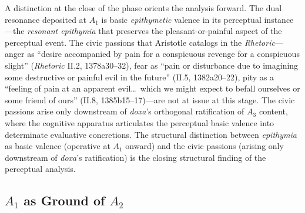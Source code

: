 \documentclass{article}
\begin{document}
A distinction at the close of the phase orients the analysis forward. The dual resonance deposited at $A_1$ is basic \textit{epithymetic} valence in its perceptual instance---the \textit{resonant epithymia} that preserves the pleasant-or-painful aspect of the perceptual event. The civic passions that Aristotle catalogs in the \textit{Rhetoric}---anger as ``desire accompanied by pain for a conspicuous revenge for a conspicuous slight'' (\textit{Rhetoric} II.2, 1378a30--32), fear as ``pain or disturbance due to imagining some destructive or painful evil in the future'' (II.5, 1382a20--22), pity as a ``feeling of pain at an apparent evil\ldots\ which we might expect to befall ourselves or some friend of ours'' (II.8, 1385b15--17)---are not at issue at this stage. The civic passions arise only downstream of \textit{doxa}'s orthogonal ratification of $A_3$ content, where the cognitive apparatus articulates the perceptual basic valence into determinate evaluative concretions. The structural distinction between \textit{epithymia} as basic valence (operative at $A_1$ onward) and the civic passions (arising only downstream of \textit{doxa}'s ratification) is the closing structural finding of the perceptual analysis.

\subsection{$A_1$ as Ground of $A_2$}
\end{document}
